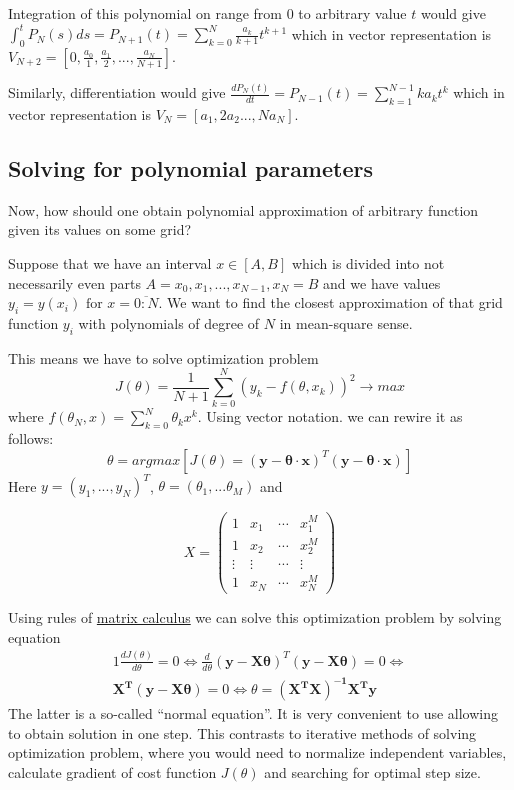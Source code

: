 \documentclass[11pt]{article} %
\begin{document}
Integration of this polynomial on range from $0$ to arbitrary value $t$ would give $\int_0^t{P_N(s)ds} = P_{N+1}(t) = \sum_{k=0}^{N} \frac{a_k}{k+1} t^{k+1}$
which in vector representation is $V_{N+2} = \left[0, \frac{a_0}{1}, \frac{a_1}{2}, ..., \frac{a_N}{N+1}\right]$. 

Similarly, differentiation would give $\frac{dP_N(t)}{dt} = P_{N-1}(t) = \sum_{k=1}^{N-1} ka_k t^k$ which in vector representation is $V_{N} = \left[a_1, 2a_2 ..., Na_N\right]$.

\subsection{Solving for polynomial parameters}
Now, how should one obtain polynomial approximation of arbitrary function given its values on some grid? 

Suppose that we have an interval $x \in [A,B]$ which is divided into not necessarily even parts $A = x_0, x_1, ..., x_{N-1}, x_N = B$ and we have values $y_i = y(x_i) \text{ for } x = \overline{0:N}$. We want to find the closest approximation of that grid function $y_i$ with polynomials of degree of $N$ in mean-square sense. 

This means we have to solve optimization problem 
\begin{equation}
J(\theta) = \frac{1}{N+1}\sum_{k=0}^{N}\left(y_k-f(\theta,x_k)\right)^2 \to max
\end{equation} where $f(\theta_N,x) =  \sum_{k=0}^N \theta_k x^k$.
Using vector notation. we can rewire it as follows:
\begin{equation}
\theta = argmax\left[J(\theta) = \left(\mathbf{y}-\mathbf{\theta \cdot x}\right)^T\left(\mathbf{y}-\mathbf{\theta \cdot x}\right)\right]
\end{equation} 
Here $y = (y_1, ..., y_N)^T$, $\theta = (\theta_1,...\theta_M)$ and 

\begin{equation}
X = 
\begin{pmatrix}
1 & x_1 & \cdots & x_1^M \\
1 & x_2 & \cdots & x_2^M \\
\vdots & \vdots & \cdots & \vdots \\
1 & x_N & \cdots & x_N^M 
\end{pmatrix}
\nonumber
\end{equation} 

Using rules of \href{http://en.wikipedia.org/wiki/Matrix\_calculus}{matrix calculus} we can solve this optimization problem by solving equation 
\begin{alignat}{1}
\frac{dJ(\theta)}{d\theta} = 0 \iff 
\frac{d}{d\theta} \left(\mathbf{y}-\mathbf{X\theta}\right)^T\left(\mathbf{y}-\mathbf{X\theta}\right) = 0
\iff \nonumber \\
\mathbf{X^T}(\mathbf{y-X\theta}) = 0 \iff \theta = \mathbf{\left(X^T X\right)^{-1}X^T y}
\end{alignat}
The latter is a so-called ``normal equation''. It is very convenient to use allowing to obtain solution in one step. This contrasts to iterative methods of solving optimization problem, where you would need to normalize independent variables, calculate gradient of cost function $J(\theta)$ and searching for optimal step size. 
\end{document}
